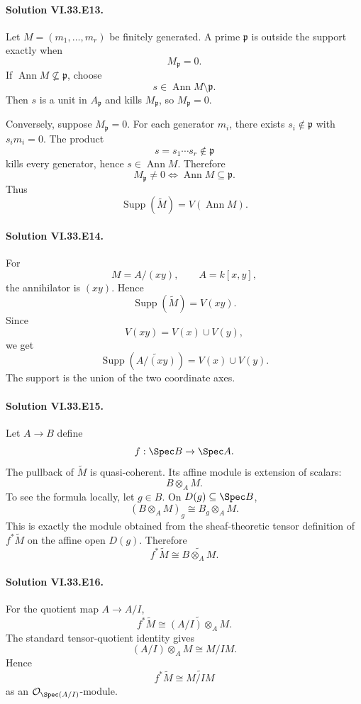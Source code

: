 \paragraph{Solution VI.33.E13.}
Let \(M=(m_1,\ldots,m_r)\) be finitely generated.  A prime \(\mathfrak p\) is outside the support exactly when
\[
M_{\mathfrak p}=0.
\]
If \(\operatorname{Ann}M\not\subseteq\mathfrak p\), choose
\[
s\in\operatorname{Ann}M\setminus\mathfrak p.
\]
Then \(s\) is a unit in \(A_{\mathfrak p}\) and kills \(M_{\mathfrak p}\), so \(M_{\mathfrak p}=0\).

Conversely, suppose \(M_{\mathfrak p}=0\). For each generator \(m_i\), there exists
\(s_i\notin\mathfrak p\) with \(s_i m_i=0\). The product
\[
s=s_1\cdots s_r\notin\mathfrak p
\]
kills every generator, hence \(s\in\operatorname{Ann}M\). Therefore
\[
M_{\mathfrak p}\ne0
\iff
\operatorname{Ann}M\subseteq\mathfrak p.
\]
Thus
\[
\boxed{\operatorname{Supp}(\widetilde M)=V(\operatorname{Ann}M)}.
\]

\paragraph{Solution VI.33.E14.}
For
\[
M=A/(xy),
\qquad
A=k[x,y],
\]
the annihilator is \((xy)\). Hence
\[
\operatorname{Supp}(\widetilde M)
=
V(xy).
\]
Since
\[
V(xy)=V(x)\cup V(y),
\]
we get
\[
\boxed{\operatorname{Supp}(\widetilde{A/(xy)})=V(x)\cup V(y)}.
\]
The support is the union of the two coordinate axes.

\paragraph{Solution VI.33.E15.}
Let \(A\to B\) define
\[
f:\Spec B\to\Spec A.
\]
The pullback of \(\widetilde M\) is quasi-coherent. Its affine module is extension of scalars:
\[
B\otimes_A M.
\]
To see the formula locally, let \(g\in B\).  On \(D(g)\subseteq\Spec B\),
\[
(B\otimes_A M)_g
\cong
B_g\otimes_A M.
\]
This is exactly the module obtained from the sheaf-theoretic tensor definition of \(f^*\widetilde M\) on the
affine open \(D(g)\). Therefore
\[
\boxed{f^*\widetilde M\cong\widetilde{B\otimes_A M}}.
\]

\paragraph{Solution VI.33.E16.}
For the quotient map \(A\to A/I\),
\[
f^*\widetilde M
\cong
\widetilde{(A/I)\otimes_A M}.
\]
The standard tensor-quotient identity gives
\[
(A/I)\otimes_A M\cong M/IM.
\]
Hence
\[
\boxed{f^*\widetilde M\cong\widetilde{M/IM}}
\]
as an \(\mathcal O_{\Spec(A/I)}\)-module.

